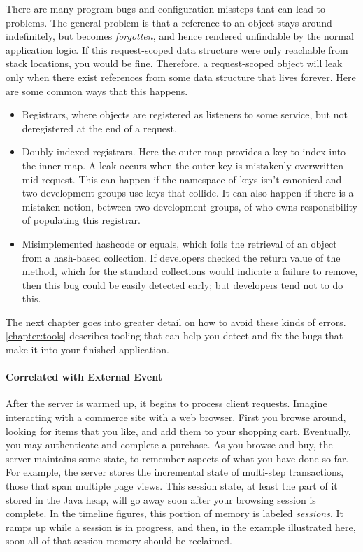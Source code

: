 There are many program bugs and configuration missteps that can lead to
problems. The general problem is that a reference to an object stays around
indefinitely, but becomes
\emph{forgotten}, and hence rendered unfindable by the normal application
logic. If this request-scoped data structure were only reachable from stack
locations, you would be fine. Therefore, a request-scoped object will leak only
when there exist references from some data structure that lives forever. Here
are some common ways that this happens.

\begin{itemize}
  \item Registrars, where objects are registered as listeners to some service,
  but not deregistered at the end of a request.
  \item Doubly-indexed registrars. Here the outer map provides a key to index
  into the inner map. A leak occurs when the outer key is mistakenly
  overwritten mid-request. This can happen if the namespace of keys isn't
  canonical and two development groups use keys that collide. It can also
  happen if there is a mistaken notion, between two development groups, of who
  owns responsibility of populating this registrar.
  \item Misimplemented hashcode or equals, which foils the retrieval of an
  object from a hash-based collection. If developers checked the return value of
  the  method, which for the standard collections would indicate a failure to remove, then
  this bug could be easily detected early; but developers tend not to do this.
\end{itemize}

The next chapter goes into greater detail on how to avoid these kinds of
errors. \autoref{chapter:tools} describes tooling that can help you
detect and fix the bugs that make it into your finished application.


\paragraph{Correlated with External Event}
\label{sec:correlated-with-need}

After the server is warmed up, it begins to process client requests. Imagine
interacting with a commerce site with a web browser. First you browse around,
looking for items that you like, and add them to your shopping cart. Eventually,
you may authenticate and complete a purchase. As you browse and buy, the server
maintains some state, to remember aspects of what you have done so far. For
example, the server stores the incremental state of multi-step transactions,
those that span multiple page views. This session state, at least the part of it
stored in the Java heap, will go away soon after your browsing session is
complete. In the timeline figures, this portion of memory is labeled
\emph{sessions}. It ramps up while a session is in progress, and then, in the
example illustrated here, soon all of that session memory should be reclaimed.

